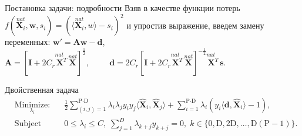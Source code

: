 \documentclass[hyperref={unicode}]{beamer}
\begin{document}
\begin{frame}{Постановка задачи: подробности}
\footnotesize
Взяв в качестве функции потерь $f(\overset{nat}{\mathbf{X}_i},\mathbf{w},s_i) = (\langle \overset{nat}{\mathbf{X}_i},w \rangle - s_i)^2$ и упростив выражение, введем замену переменных: $\mathbf{w'} = \mathbf{Aw-d}$,\\ \;\;\;\;\;\;\;\;\;\;\;\;\;\;\;$\mathbf{A} = \left[ \mathbf{I} + 2C_r\overset{nat\;\;\;}{\mathbf{X}^T}\overset{nat}{\mathbf{X}} \right]^{\frac{1}{2}},\hspace{1cm}
\mathbf{d} = 2C_r\left[ \mathbf{I}+2C_r\overset{nat\;\;\;}{\mathbf{X}^T}\overset{nat}{\mathbf{X}}\right]^{-\frac{1}{2}}\overset{nat\;\;\;}{\mathbf{X}^T}\mathbf{s}.$


\begin{block}{\normalsize Двойственная задача}
\footnotesize
$$
\begin{aligned}
& \underset{\lambda_{i}}{\text{Minimize:}}
& & \frac{1}{2}\sum\limits_{(i,j)=1}^{\text{P}\cdot\text{D}}\lambda_{i}\lambda_{j}y_{i}y_{j}\langle \widehat{\mathbf{X}}_{i},\widehat{\mathbf{X}}_{j}\rangle + \sum_{i=1}^{\text{P}\cdot\text{D}}{\lambda_{i} \left(y_{i}\langle \mathbf{d}, \widehat{\mathbf{X}}_{i} \rangle - 1 \right)}, \\
& \text{Subject to:}
& & 0\leq\lambda_{i} \leq C,\; \sum_{j=1}^D{\lambda_{k+j}y_{k+j}} = 0,\; k \in \{ 0,\text{D},2\text{D},\hdots,\text{D}(\text{P}-1) \}. \\
\end{aligned}
$$
\end{block}

\end{frame}
\end{document}
